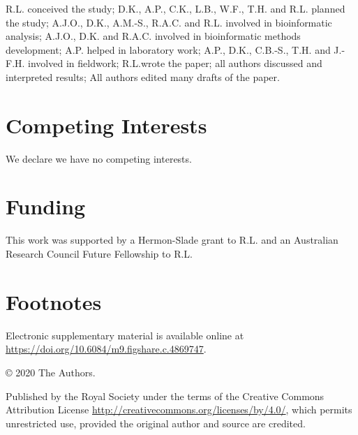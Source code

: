 R.L. conceived the study; D.K., A.P., C.K., L.B., W.F., T.H. and R.L. planned the study; A.J.O., D.K., A.M.-S., R.A.C. and R.L. involved in bioinformatic analysis; A.J.O., D.K. and R.A.C. involved in bioinformatic methods development; A.P. helped in laboratory work; A.P., D.K., C.B.-S., T.H. and J.-F.H. involved in fieldwork; R.L.wrote the paper; all authors discussed and interpreted results; All authors edited many drafts of the paper.

\section{Competing Interests}

We declare we have no competing interests.

\section{Funding}

This work was supported by a Hermon-Slade grant to R.L. and an Australian Research Council Future Fellowship to R.L.

\section{Footnotes}

Electronic supplementary material is available online at \url{https://doi.org/10.6084/m9.figshare.c.4869747}.

© 2020 The Authors.

Published by the Royal Society under the terms of the Creative Commons Attribution License \url{http://creativecommons.org/licenses/by/4.0/}, which permits unrestricted use, provided the original author and source are credited.

\printbibliography[segment=\therefsegment]{}
